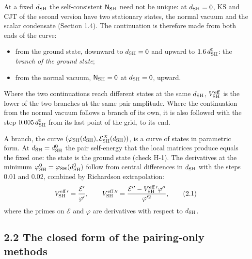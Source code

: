 \documentclass[
  10pt,
]{article}
\providecommand{\tightlist}{%
  \setlength{\itemsep}{0pt}\setlength{\parskip}{0pt}}
\begin{document}
At a fixed \(d_{\rm SH}\) the self-consistent \(\mathsf N_{\rm SH}\)
need not be unique: at \(d_{\rm SH}=0\), KS and CJT of the second
version have two stationary states, the normal vacuum and the scalar
condensate (Section 1.4). The continuation is therefore made from both
ends of the curve:

\begin{itemize}
\tightlist
\item
  from the ground state, downward to \(d_{\rm SH}=0\) and upward to
  \(1.6\,d^0_{\rm SH}\): the \emph{branch of the ground state};
\item
  from the normal vacuum, \(\mathsf N_{\rm SH}=0\) at \(d_{\rm SH}=0\),
  upward.
\end{itemize}

Where the two continuations reach different states at the same
\(d_{\rm SH}\), \(V^{\rm eff}_{\rm SH}\) is the lower of the two
branches at the same pair amplitude. Where the continuation from the
normal vacuum follows a branch of its own, it is also followed with the
step \(0.005\,d^0_{\rm SH}\) from its last point of the grid, to its
end.

A branch, the curve
\((\varphi_{\rm SH}(d_{\rm SH}),\mathcal E^X_{\rm SH}(d_{\rm SH}))\), is
a curve of states in parametric form. At \(d_{\rm SH}=d^0_{\rm SH}\) the
pair self-energy that the local matrices produce equals the fixed one:
the state is the ground state (check H-1). The derivatives at the
minimum \(\varphi^0_{\rm SH}=\varphi_{\rm SH}(d^0_{\rm SH})\) follow
from central differences in \(d_{\rm SH}\) with the steps 0.01 and 0.02,
combined by Richardson extrapolation:
\[V^{\rm eff\,\prime}_{\rm SH}=\frac{\mathcal E'}{\varphi'},\qquad V^{\rm eff\,\prime\prime}_{\rm SH}=\frac{\mathcal E''-V^{\rm eff\,\prime}_{\rm SH}\varphi''}{\varphi'^2},\tag{2.1}\]
where the primes on \(\mathcal E\) and \(\varphi\) are derivatives with
respect to \(d_{\rm SH}\).

\hypertarget{the-closed-form-of-the-pairing-only-methods}{%
\subsection{2.2 The closed form of the pairing-only
methods}\label{the-closed-form-of-the-pairing-only-methods}}
\end{document}
